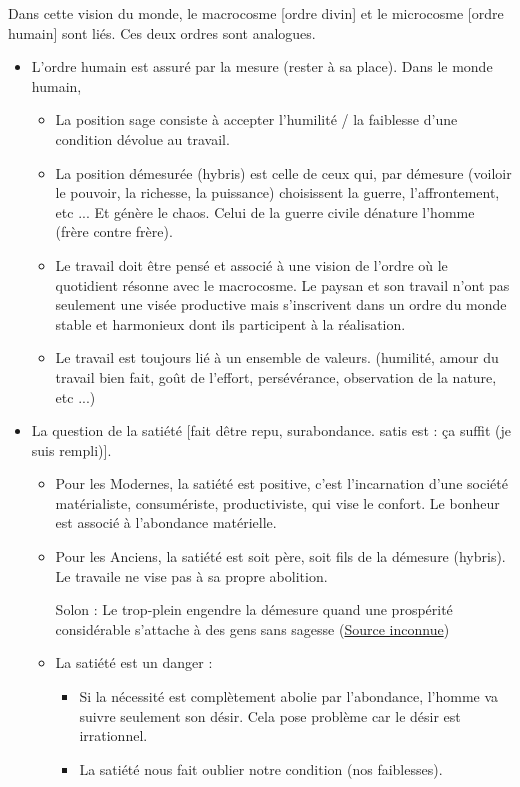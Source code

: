 \documentclass[a4paper, 11pt, hidelinks]{article}
\newcommand{\bs}{\bigskip}
\newcommand{\citer}[3]{\bs \begin{center} \textcolor{authorGray}{#1 :} \textcolor{citationRed}{\og #2 \fg} \textcolor{authorGray}{(\underline{#3})} \end{center} \bs}
\begin{document}
\bs

Dans cette vision du monde, le macrocosme [ordre divin] et le microcosme [ordre humain] sont liés. Ces deux ordres sont analogues.
\begin{itemize}
    \item L'ordre humain est assuré par la mesure (rester à sa place). Dans le monde humain,
        \begin{itemize}
            \item La position \og sage \fg consiste à accepter l'humilité / la faiblesse d'une condition dévolue au travail.
            \item La position \og démesurée \fg (hybris) est celle de ceux qui, par démesure (voiloir le pouvoir, la richesse, la puissance)
            choisissent la guerre, l'affrontement, etc ... Et génère le chaos. Celui de la guerre civile dénature l'homme (frère contre frère).
            \item Le travail doit être pensé et associé à une vision de l'ordre où le quotidient résonne avec le macrocosme. Le paysan et son 
            travail n'ont pas seulement une visée \og productive \fg mais s'inscrivent dans un ordre du monde stable et harmonieux dont ils participent 
            à la réalisation.
            \item Le travail est toujours lié à un ensemble de valeurs. (humilité, amour du travail bien fait, goût de l'effort, persévérance, observation
            de la nature, etc ...)
        \end{itemize}
    \item La question de la satiété [fait dêtre repu, surabondance. \og satis est \fg : \og ça suffit \fg (je suis rempli)].
        \begin{itemize}
            \item Pour les Modernes, la satiété est positive, c'est l'incarnation d'une société matérialiste, consumériste, productiviste, qui vise
            le confort. Le bonheur est associé à l'abondance matérielle.
            \item Pour les Anciens, la satiété est soit père, soit fils de la démesure (hybris). Le travaile ne vise pas à sa propre abolition.
            \citer{Solon}{Le trop-plein engendre la démesure quand une prospérité considérable s'attache à des gens sans sagesse}{Source inconnue}
            \item La satiété est un danger :
                \begin{itemize}
                    \item Si la nécessité est complètement abolie par l'abondance, l'homme va suivre seulement son désir. Cela pose problème car le désir est irrationnel.
                    \item La satiété nous fait oublier notre condition (nos faiblesses). 
                \end{itemize}
        \end{itemize}
\end{itemize}
\end{document}
